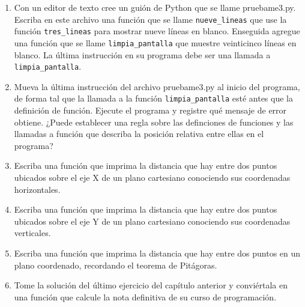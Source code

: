 \begin{enumerate}
	\item Con un editor de texto cree un guión de Python que se llame 
	pruebame3.py. Escriba en este 
	archivo una función que se llame \verb+nueve_lineas+ que use la función 
	\verb+tres_lineas+ para mostrar nueve líneas 
	en blanco. Enseguida agregue una función que se llame 
	\verb+limpia_pantalla+ que muestre veinticinco líneas en 
	blanco. La última instrucción en su programa debe ser una llamada a 
	\verb+limpia_pantalla+.
	
	\item Mueva la última instrucción del archivo pruebame3.py al inicio del 
	programa, de forma tal que la llamada a la 
	función \verb+limpia_pantalla+ esté antes que la definición de función. 
	Ejecute el programa y registre qué mensaje de 
	error obtiene. ¿Puede establecer una regla sobre las definciones de 
	funciones y las llamadas a función que describa 
	la posición relativa entre ellas en el programa?
	
	\item Escriba una función que imprima la distancia que hay entre dos puntos 
	ubicados sobre el eje X de un plano cartesiano conociendo sus coordenadas 
	horizontales.
	
	\item Escriba una función que imprima la distancia que hay entre dos puntos 
	ubicados sobre el eje Y de un plano cartesiano conociendo sus coordenadas 
	verticales.
	
	\item Escriba una función que imprima la distancia que hay entre dos puntos 
	en un plano coordenado, recordando el teorema de Pitágoras.
	
	\item Tome la solución del último ejercicio del capítulo anterior y 
	conviértala en una función que calcule la nota definitiva de su curso de 
	programación.
 \end{enumerate}
